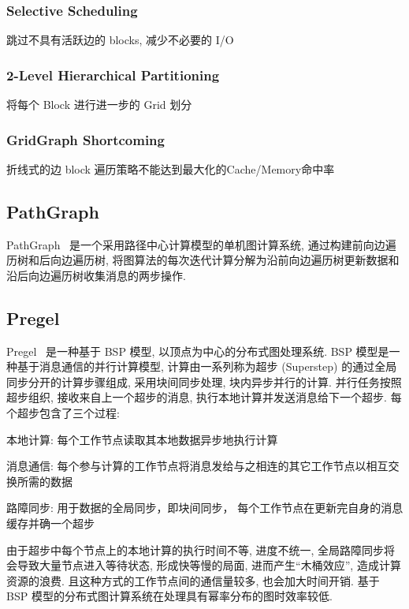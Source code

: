 \documentclass[UTF8,12pt,a4paper]{article}
\begin{document}
\subsubsection{Selective Scheduling}
跳过不具有活跃边的 blocks, 减少不必要的 I/O
\subsubsection{2-Level Hierarchical Partitioning}
将每个 Block 进行进一步的 Grid 划分
\subsubsection{GridGraph Shortcoming}
\begin{compactitem}
  \item 折线式的边 block 遍历策略不能达到最大化的Cache/Memory命中率
\end{compactitem}

\subsection{PathGraph}
PathGraph~\cite{DBLP:journals/tpds/YuanXLJ16}
是一个采用路径中心计算模型的单机图计算系统, 通过构建前向边遍历树和后向边遍历树,
将图算法的每次迭代计算分解为沿前向边遍历树更新数据和沿后向边遍历树收集消息的两步操作.

\subsection{Pregel}
Pregel~\cite{DBLP:conf/sigmod/MalewiczABDHLC10}
是一种基于 BSP 模型, 以顶点为中心的分布式图处理系统.
BSP 模型是一种基于消息通信的并行计算模型,
计算由一系列称为超步 (Superstep) 的通过全局同步分开的计算步骤组成,
采用块间同步处理, 块内异步并行的计算.
并行任务按照超步组织, 接收来自上一个超步的消息, 执行本地计算并发送消息给下一个超步.
每个超步包含了三个过程:
\begin{compactitem}
  \item 本地计算: 每个工作节点读取其本地数据异步地执行计算
  \item 消息通信: 
  每个参与计算的工作节点将消息发给与之相连的其它工作节点以相互交换所需的数据
  \item 路障同步: 用于数据的全局同步，即块间同步，
  每个工作节点在更新完自身的消息缓存并确一个超步
\end{compactitem}
由于超步中每个节点上的本地计算的执行时间不等, 进度不统一, 
全局路障同步将会导致大量节点进入等待状态, 形成快等慢的局面,
进而产生``木桶效应'', 造成计算资源的浪费.
且这种方式的工作节点间的通信量较多, 也会加大时间开销.
基于 BSP 模型的分布式图计算系统在处理具有幂率分布的图时效率较低.
\end{document}
